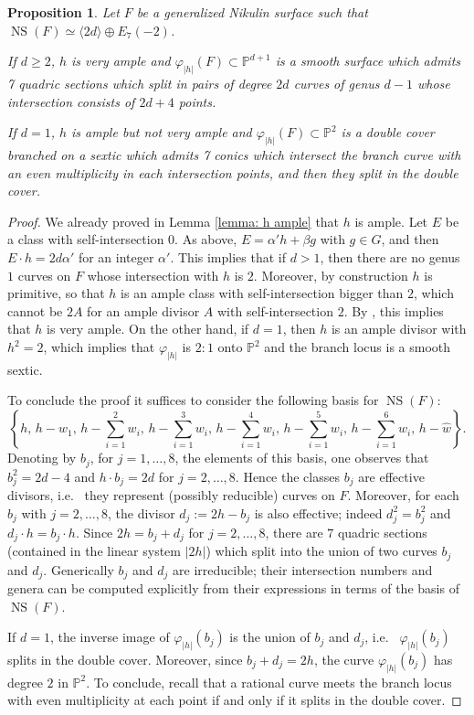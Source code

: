 \documentclass{amsart}
\newtheorem{prop}[thm]{Proposition}
\theoremstyle{definition}
\numberwithin{equation}{section}
\numberwithin{equation}{section} \theoremstyle{definition}
\DeclareMathOperator{\NS}{NS}
\begin{document}
\begin{prop}\label{prop: proj models direct sum}
Let $F$ be a generalized Nikulin surface such that $\NS(F)\simeq \langle 2d\rangle\oplus E_7(-2)$. %

If $d\geq 2$, $h$ is very ample and $\varphi_{|h|}(F)\subset\mathbb{P}^{d+1}$ is a smooth surface which admits 7 quadric sections which split in pairs of degree $2d$ curves of genus $d-1$ whose intersection consists of $2d+4$ points.

If $d=1$, $h$ is ample but not very ample and $\varphi_{|h|}(F)\subset\mathbb{P}^{2}$ is a double cover branched on a sextic which admits 7 conics which intersect the branch curve with an even multiplicity in each intersection points, and then they split in the double cover.
\end{prop}
\begin{proof}
We already proved in Lemma \ref{lemma: h ample} that $h$ is ample. Let $E$ be a class with self-intersection $0$. As above, $E=\alpha' h+\beta g$ with
$g\in G$, and then $E\cdot h=2d\alpha'$ for an integer $\alpha'$. This implies that
if $d>1$, then there are no genus $1$ curves on $F$ whose intersection with $h$ is
$2$. Moreover, by construction $h$ is primitive, so that $h$ is an ample class with
self-intersection bigger than $2$, which cannot be $2A$ for an ample divisor $A$ with
self-intersection $2$. By \cite[Theorem 5.2]{SD}, this implies that $h$ is very ample.
On the other hand, if $d=1$, then $h$ is an ample divisor with $h^2=2$, which implies
that $\varphi_{|h|}$ is $2:1$ onto $\mathbb{P}^2$ and the branch locus is a smooth
sextic.

To conclude the proof it suffices to consider the following basis for $\NS(F)$:
\[
\left\{h,\, h-w_1,\, h-\sum_{i=1}^2w_i,\, h-\sum_{i=1}^3w_i,\,
h-\sum_{i=1}^4w_i,\, h-\sum_{i=1}^5w_i,\, h-\sum_{i=1}^6w_i,\,
h-\hat{w}\right\}.
\]
Denoting by $b_j$, for $j=1,\ldots,8$, the elements of this basis, one observes that $b_j^2=2d-4$ and
$h\cdot b_j=2d$ for $j=2,\ldots, 8$. Hence the classes $b_j$ are effective divisors,
i.e.~ they represent (possibly reducible) curves on $F$. Moreover, for each $b_j$
with $j=2,\ldots, 8$, the divisor $d_j:=2h-b_j$ is also effective; indeed
$d_j^2=b_j^2$ and $d_j\cdot h=b_j\cdot h$. Since $2h=b_j+d_j$ for $j=2,\ldots, 8$,
there are $7$ quadric sections (contained in the linear system $|2h|$) which split
into the union of two curves $b_j$ and $d_j$. Generically $b_j$ and $d_j$ are
irreducible; their intersection numbers and genera can be computed explicitly from
their expressions in terms of the basis of $\NS(F)$.

If $d=1$, the inverse image of $\varphi_{|h|}(b_j)$ is the union of $b_j$ and $d_j$,
i.e.~ $\varphi_{|h|}(b_j)$ splits in the double cover. Moreover, since
$b_j+d_j=2h$, the curve $\varphi_{|h|}(b_j)$ has degree $2$ in $\mathbb{P}^2$.
To conclude, recall that a rational curve meets the branch locus with even multiplicity
at each point if and only if it splits in the double cover.
\end{proof}
\end{document}

